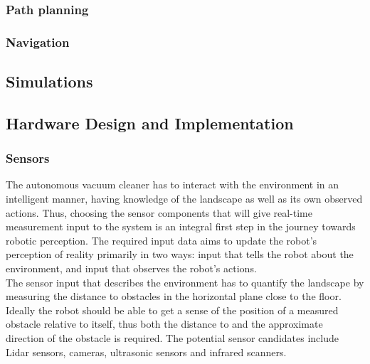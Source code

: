 \subsubsection{Path planning}
\label{sec:path-plan}

\subsubsection{Navigation}
\label{sec:navigation}

\subsection{Simulations}
\label{sec:sim}

\subsection{Hardware Design and Implementation}

\subsubsection{Sensors}
\label{sec:sensors}

The autonomous vacuum cleaner has to interact with the environment in an intelligent manner, having knowledge of the landscape as well as its own observed actions. Thus, choosing the sensor components that will give real-time measurement input to the system is an integral first step in the journey towards robotic perception. The required input data aims to update the robot's perception of reality primarily in two ways: input that tells the robot about the environment, and input that observes the robot's actions. \\

The sensor input that describes the environment has to quantify the landscape by measuring the distance to obstacles in the horizontal plane close to the floor. Ideally the robot should be able to get a sense of the position of a measured obstacle relative to itself, thus both the distance to and the approximate direction of the obstacle is required. The potential sensor candidates include Lidar sensors, cameras, ultrasonic sensors and infrared scanners. \\

